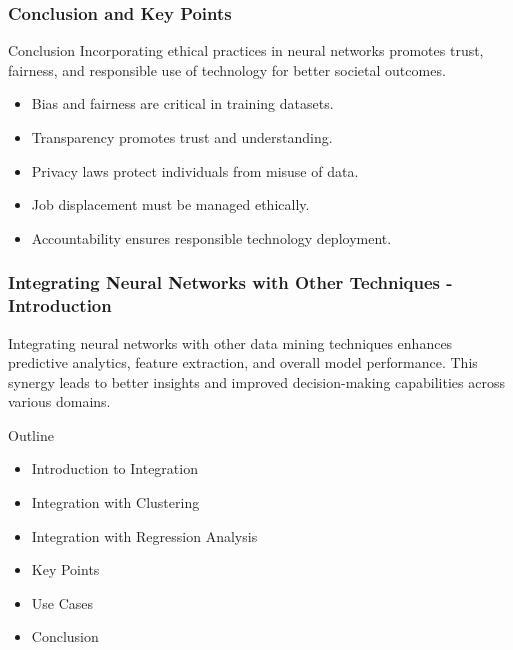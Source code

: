 \documentclass[aspectratio=169]{beamer}
\begin{document}
\begin{frame}[fragile]
    \frametitle{Conclusion and Key Points}
    \begin{block}{Conclusion}
        Incorporating ethical practices in neural networks promotes trust, fairness, and responsible use of technology for better societal outcomes.
    \end{block}
    
    \begin{itemize}
        \item Bias and fairness are critical in training datasets.
        \item Transparency promotes trust and understanding.
        \item Privacy laws protect individuals from misuse of data.
        \item Job displacement must be managed ethically.
        \item Accountability ensures responsible technology deployment.
    \end{itemize}
\end{frame}

\begin{frame}[fragile]
    \frametitle{Integrating Neural Networks with Other Techniques - Introduction}
    Integrating neural networks with other data mining techniques enhances predictive analytics, feature extraction, and overall model performance. This synergy leads to better insights and improved decision-making capabilities across various domains.
    
    \begin{block}{Outline}
        \begin{itemize}
            \item Introduction to Integration
            \item Integration with Clustering
            \item Integration with Regression Analysis
            \item Key Points
            \item Use Cases
            \item Conclusion
        \end{itemize}
    \end{block}
\end{frame}
\end{document}
